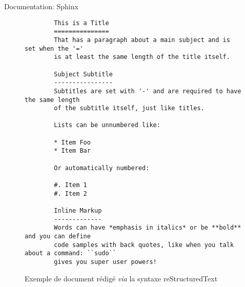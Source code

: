 \begin{frame}[fragile]{Documentation: Sphinx}
  \tiny
  \begin{center}
    \begin{figure}
      \begin{lstlisting}
        This is a Title
        ===============
        That has a paragraph about a main subject and is set when the '='
        is at least the same length of the title itself.

        Subject Subtitle
        ----------------
        Subtitles are set with '-' and are required to have the same length
        of the subtitle itself, just like titles.

        Lists can be unnumbered like:

        * Item Foo
        * Item Bar

        Or automatically numbered:

        #. Item 1
        #. Item 2

        Inline Markup
        -------------
        Words can have *emphasis in italics* or be **bold** and you can define
        code samples with back quotes, like when you talk about a command: ``sudo``
        gives you super user powers!
      \end{lstlisting}      
      \caption{Exemple de document rédigé \textit{via} la syntaxe \textsf{reStructuredText}}      
    \end{figure}
  \end{center}
\end{frame}
